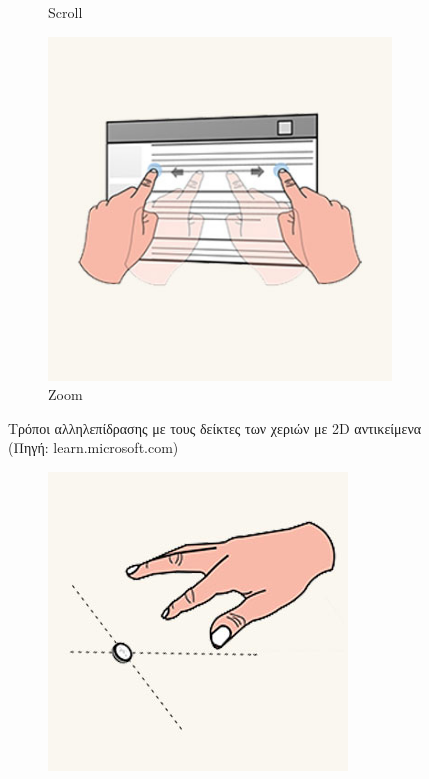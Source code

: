 \begin{enumerate}
\begin{figure}[t]
\begin{subfigure}{0.3\textwidth}
            \caption{Scroll}\label{fig:hololensInteractionScroll}
        \end{subfigure}%
        \begin{subfigure}{0.3\textwidth}
            \centering
            \includegraphics[width=0.9\linewidth]{images/hololens_interaction_zoom.jpg}
            \caption{Zoom}\label{fig:hololensInteractionZoom}
        \end{subfigure}%
        \caption[Τρόποι αλληλεπίδρασης με τους δείκτες των χεριών με 2D αντικείμενα]{Τρόποι αλληλεπίδρασης με τους δείκτες των χεριών με 2D αντικείμενα {\footnotesize (Πηγή: learn.microsoft.com)}}\label{fig:hololensInteraction2D}
    \end{figure}
    \begin{figure}[!ht]
        \centering
        \begin{subfigure}{0.25\textwidth}
            \centering
            \includegraphics[width=0.9\linewidth]{images/hololens_interaction_press_step1.jpg}

\end{subfigure}
\end{figure}
\end{enumerate}
